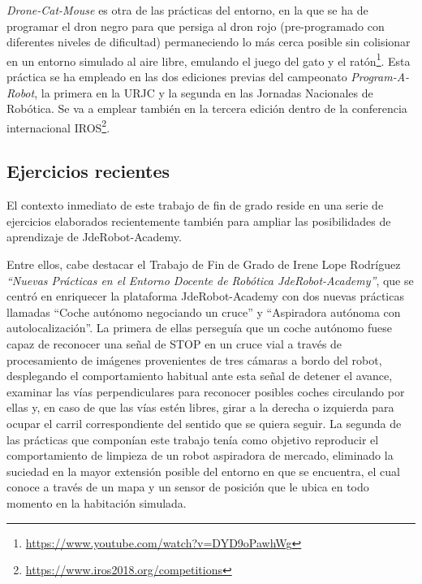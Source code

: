 \textit{Drone-Cat-Mouse} es otra de las prácticas del entorno, en la que se ha de programar el dron negro para que persiga al dron rojo (pre-programado con diferentes niveles de dificultad) permaneciendo lo más cerca posible sin colisionar en un entorno simulado al aire libre, emulando el juego del gato y el ratón\footnote{\url{https://www.youtube.com/watch?v=DYD9oPawhWg}}. Esta práctica se  ha empleado en las dos ediciones previas del campeonato \textit{Program-A-Robot}, la primera en la URJC y la segunda en las Jornadas Nacionales de Robótica. Se va a emplear también en la tercera edición dentro de la conferencia internacional IROS\footnote{\url{https://www.iros2018.org/competitions}}.

\subsection{Ejercicios recientes}
El contexto inmediato de este trabajo de fin de grado reside en una serie de ejercicios elaborados recientemente también para ampliar las posibilidades de aprendizaje de JdeRobot-Academy. 

Entre ellos, cabe destacar el Trabajo de Fin de Grado de Irene Lope Rodríguez \textit{“Nuevas Prácticas en el Entorno Docente de Robótica JdeRobot-Academy”}\cite{tfg1}, que se centró en enriquecer la plataforma JdeRobot-Academy con dos nuevas prácticas llamadas ``Coche autónomo negociando un cruce'' y “Aspiradora autónoma con autolocalización”. La primera de ellas perseguía que un coche autónomo fuese capaz de reconocer una señal de STOP en un cruce vial a través de procesamiento de imágenes provenientes de tres cámaras a bordo del robot, desplegando el comportamiento habitual ante esta señal de detener el avance, examinar las vías perpendiculares para reconocer posibles coches circulando por ellas y, en caso de que las vías estén libres, girar a la derecha o izquierda para ocupar el carril correspondiente del sentido que se quiera seguir. La segunda de las prácticas que componían este trabajo tenía como objetivo reproducir el comportamiento de limpieza de un robot aspiradora de mercado, eliminado la suciedad en la mayor extensión posible del entorno en que se encuentra, el cual conoce a través de un mapa y un sensor de posición que le ubica en todo momento en la habitación simulada.

